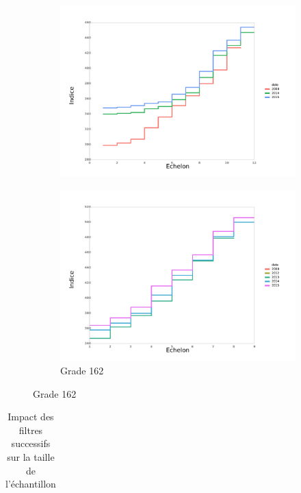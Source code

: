 \documentclass[11pt,a4paper]{article}
\begin{document}
\begin{figure}[ht]
\begin{subfigure}[b]{0.55\linewidth}
    \label{echelon_by_neg_2} 
    \centering
    \includegraphics[width=1\linewidth]{AA_14_grille_by_neg.pdf} 
  \end{subfigure}%
  \begin{subfigure}[b]{0.55\linewidth}
        \caption{Grade 162} 
    \label{echelon_by_neg_3} 
    \centering
    \includegraphics[width=1\linewidth]{AA_162_grille_by_neg.pdf} 
  \end{subfigure} 
\end{figure}



\begin{table}[h!]
\centering
\caption{Impact des filtres successifs sur la taille de l'échantillon} 
\label{filters_AA}
\begin{tabular}{lcc}
\toprule

\bottomrule
\end{tabular}
\end{table}
\end{document}
